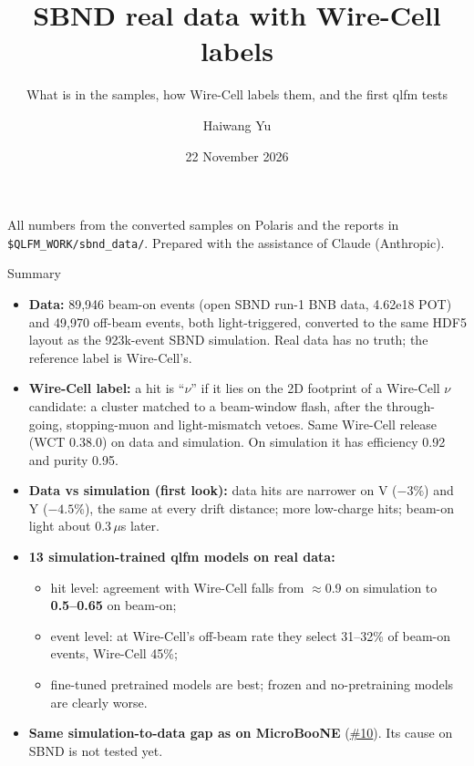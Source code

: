 \documentclass[aspectratio=169,10pt]{beamer}
\title{SBND real data with Wire-Cell labels}
\subtitle{What is in the samples, how Wire-Cell labels them, and the first qlfm tests}
\author{Haiwang Yu}
\institute{fm4npp-lartpc \;\textbullet\; issue \iss{14} (data), \iss{11} (simulation)}
\date{22 November 2026}
\newcommand{\code}[1]{\texttt{#1}}
\newcommand{\bad}[1]{{\color{red!70!black}\textbf{#1}}}
\newcommand{\gh}{https://github.com/HaiwangYu/fm4npp-lartpc}
\newcommand{\iss}[1]{\href{\gh/issues/#1}{\color{blue!60!black}\##1}}
\begin{document}
\begin{frame}
  \titlepage
  \vfill
  {\tiny All numbers from the converted samples on Polaris and the reports in \code{\$QLFM\_WORK/sbnd\_data/}.
  Prepared with the assistance of Claude (Anthropic).}
\end{frame}

\begin{frame}{Summary}
  \footnotesize
  \begin{itemize}\setlength{\itemsep}{5pt}
    \item \textbf{Data:} 89,946 beam-on events (open SBND run-1 BNB data, 4.62e18 POT) and 49,970 off-beam events, both
      light-triggered, converted to the same HDF5 layout as the 923k-event SBND simulation. Real data has no truth; the
      reference label is Wire-Cell's.
    \item \textbf{Wire-Cell label:} a hit is ``$\nu$'' if it lies on the 2D footprint of a Wire-Cell $\nu$ candidate: a
      cluster matched to a beam-window flash, after the through-going, stopping-muon and light-mismatch vetoes. Same
      Wire-Cell release (WCT 0.38.0) on data and simulation. On simulation it has efficiency 0.92 and purity 0.95.
    \item \textbf{Data vs simulation (first look):} data hits are narrower on V ($-3\%$) and Y ($-4.5\%$), the same at
      every drift distance; more low-charge hits; beam-on light about 0.3\,$\mu$s later.
    \item \textbf{13 simulation-trained qlfm models on real data:}
      \begin{itemize}
        \item hit level: agreement with Wire-Cell falls from $\approx$0.9 on simulation to \bad{0.5--0.65} on beam-on;
        \item event level: at Wire-Cell's off-beam rate they select 31--32\% of beam-on events, Wire-Cell 45\%;
        \item fine-tuned pretrained models are best; frozen and no-pretraining models are clearly worse.
      \end{itemize}
    \item \textbf{Same simulation-to-data gap as on MicroBooNE} (\iss{10}). Its cause on SBND is not tested yet.
  \end{itemize}
\end{frame}
\end{document}
